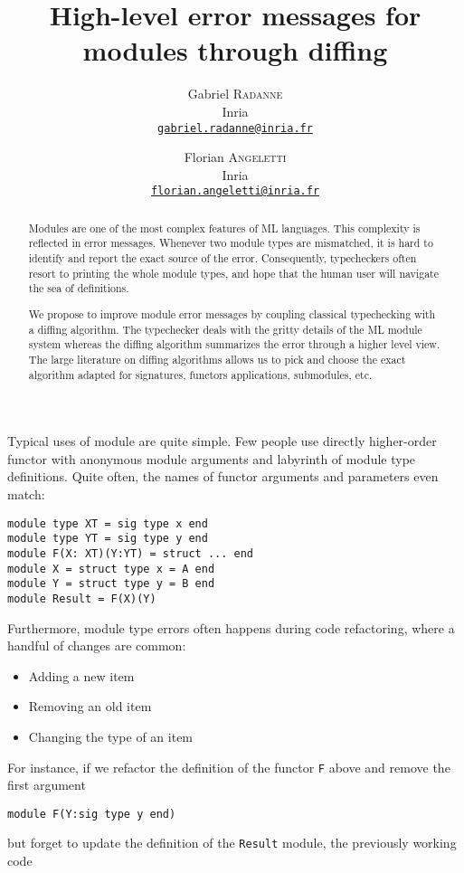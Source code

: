 \documentclass[a4paper,11pt]{scrartcl}
\title{High-level error messages for modules through diffing}
\author{
  Gabriel \textsc{Radanne}\\
  Inria\\
  \href{mailto:gabriel.radanne@inria.fr}
  {\nolinkurl{gabriel.radanne@inria.fr}}
  \and
  Florian \textsc{Angeletti}\\
  Inria\\
  \href{mailto:florian.angeletti@inria.fr}
  {\nolinkurl{florian.angeletti@inria.fr}}
}
\begin{document}
\maketitle

\begin{abstract}
Modules are one of the most complex features of ML languages. This complexity is reflected in error messages.
Whenever two module types are mismatched, it is hard to identify and report the exact source of the error.
Consequently, typecheckers often resort to printing the whole module types, and hope that the human user will navigate the sea of definitions.

We propose to improve module error messages by coupling classical typechecking with
a diffing algorithm.
The typechecker deals with the gritty details of
the ML module system whereas the diffing algorithm summarizes the error through
a higher level view.
The large literature on diffing algorithms allows us to pick and choose
the exact algorithm adapted for signatures, functors applications, submodules, etc.
\end{abstract}


Typical uses of module are quite simple. Few people use directly higher-order functor with anonymous module arguments and labyrinth of module type definitions. Quite often, the names of functor arguments and parameters even match:
\begin{verbatim}
module type XT = sig type x end
module type YT = sig type y end
module F(X: XT)(Y:YT) = struct ... end
module X = struct type x = A end
module Y = struct type y = B end
module Result = F(X)(Y)
\end{verbatim}

Furthermore, module type errors often happens during code refactoring, where a handful of changes are common:
\begin{itemize}
\item Adding a new item
\item Removing an old item
\item Changing the type of an item
\end{itemize}

For instance, if we refactor the definition of the functor \texttt{F} above and remove the first argument

\begin{verbatim}
module F(Y:sig type y end)
\end{verbatim}

but forget to update the definition of the \texttt{Result} module, the previously working code
\end{document}
